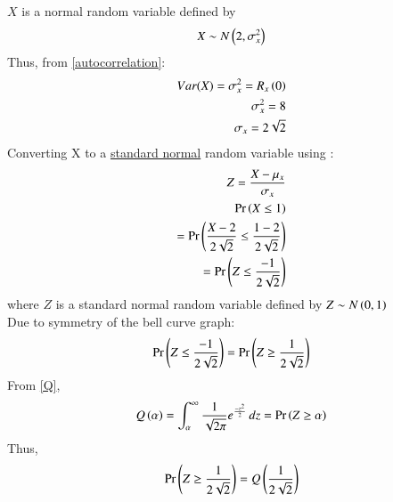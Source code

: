 
$X$ is a normal random variable defined by 
\begin{align}
    X \sim N\left(2 , \sigma_x^2 \right)
\end{align}
Thus, from \eqref{autocorrelation}:
\begin{align}
    Var(X) = \sigma_x^2 = R_x\left(0\right)\\
     \sigma_x^2 = 8\\
     \sigma_x = 2\sqrt{2}
\end{align}
Converting X to a \underline{standard normal} random variable using : 
\begin{align}
   Z = \frac{X - \mu_x}{\sigma_x}\\
    \Pr\left(X\leq 1\right)\\
    = \Pr\left(\frac{X - 2}{2\sqrt{2}} \leq \frac{1-2}{2\sqrt{2}}\right)\\
     = \Pr\left(Z \leq \frac{-1}{2\sqrt{2}}\right)
\end{align}
where $Z$ is a standard normal random variable defined by $Z \sim N\left(0,1\right)$ \\
Due to symmetry of the bell curve graph:
\begin{align}
    \Pr\left(Z\leq \frac{-1}{2\sqrt{2}}\right) = \Pr\left(Z \geq \frac{1}{2\sqrt{2}}\right)
\end{align}
From \eqref{Q},
\begin{align}
    Q\left(\alpha\right) = \int_{\alpha}^{\infty} \frac{1}{\sqrt{2\pi}} e^{\frac{-z^2}{2}}\,dz = \Pr\left(Z \geq \alpha \right)
\end{align}
Thus,
\begin{align}
    \Pr\left(Z \geq \frac{1}{2\sqrt{2}}\right) = Q\left(\frac{1}{2\sqrt{2}}\right)
\end{align}